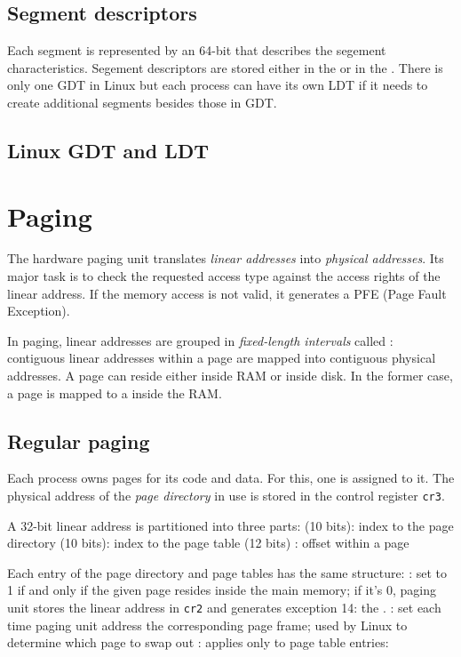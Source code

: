 \subsection{Segment descriptors}
Each segment is represented by an 64-bit  that
describes the segement characteristics. Segement descriptors are stored either
in the  or in the . 
There is only one GDT in Linux but each process can have its own LDT if it
needs to create additional segments besides those in GDT.


\subsection{Linux GDT and LDT}


\section{Paging}
The hardware paging unit translates {\em linear addresses\/} into {\em
  physical addresses\/}. Its major task is to check the requested access type
against the access rights of the linear address.
If the memory access is not valid, it generates a PFE (Page Fault Exception). 

In paging, linear addresses are grouped in {\em fixed-length intervals} called
: contiguous linear addresses within a page are mapped into
contiguous physical addresses. 
A page can reside either inside RAM or inside disk. In the former case, a page
is mapped to a  inside the RAM.


\subsection{Regular paging}
Each process owns pages for its code and data.  For this, one  is assigned to it. The physical address of the {\em page
  directory\/} in use is stored in the control register {\tt cr3}.  

A 32-bit linear address is partitioned into three parts:
\bit
\w {} (10 bits): index to the page directory
\w {} (10 bits): index to the page table
\w {} (12 bits) : offset within a page 
\eit

Each entry of the page directory and page tables has the same structure:
\bit
\w {}: set to 1 if and only if the given page resides inside the
main memory; if it's 0, paging unit stores the linear address in {\tt cr2} and
generates exception 14: the .
\w {}: set each time paging unit address the corresponding
page frame; used by Linux to determine which page to swap out
\w {}: applies only to page table entries: 
\eit

